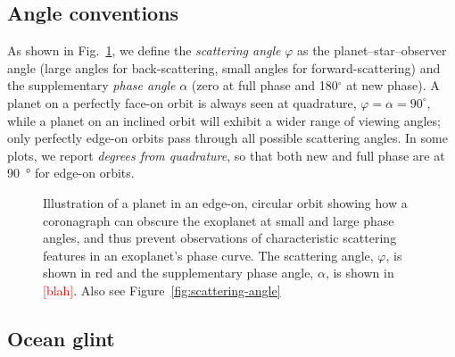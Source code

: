 \documentclass[usenatbib]{mnras}
\newcommand{\todo}[1]{\textcolor{red}{[#1]}}
\begin{document}

\subsection{Angle conventions}
As shown in Fig.~\ref{fig:annotated-orbit}, we define the \emph{scattering angle} $\varphi$ as the planet--star--observer angle 
(large angles for back-scattering, small angles for forward-scattering) and the supplementary \emph{phase angle} $\alpha$ (zero at full phase and 180$^\circ$ at new phase). 
A planet on a perfectly face-on orbit is always seen at quadrature, $\varphi = \alpha = 90^\circ$, while a planet on an inclined orbit will exhibit a wider range of viewing angles; only perfectly edge-on orbits pass through all possible scattering angles. 
In some plots, we report \emph{degrees from quadrature}, so that both new and full phase are at \qty{90}{\degree} for edge-on orbits.

\begin{figure}
    \centering
    
    \caption{
        Illustration of a planet in an edge-on, circular orbit showing how a coronagraph can obscure the exoplanet at small and large phase angles, and thus prevent observations of characteristic scattering features in an exoplanet's
        phase curve. 
        The scattering angle, $\varphi$, is shown in red and the supplementary phase angle, $\alpha$, is shown in \todo{blah}. Also see Figure~\ref{fig:scattering-angle}
    }
    \label{fig:annotated-orbit}
\end{figure}

\subsection{Ocean glint}
\end{document}
